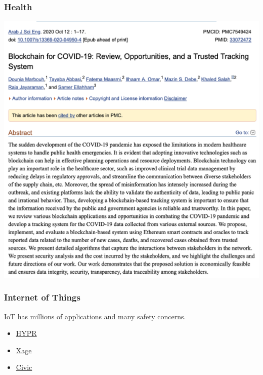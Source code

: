 \documentclass{beamer}
\begin{document}
\begin{frame}
  \frametitle{Health}
  
\centering
	\includegraphics[scale=0.3]{paper}
\end{frame}
\begin{frame}
  \frametitle{Internet of Things}
 IoT has millions of applications and many safety concerns. \pause
	\begin{itemize}
		\item \href{https://www.hypr.com/}{HYPR} \pause
		\item \href{https://xage.com/}{Xage} \pause
		\item \href{https://www.civic.com/}{Civic}
	\end{itemize}
\end{frame}
\end{document}
